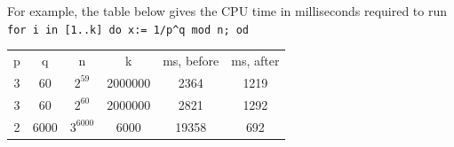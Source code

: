 \documentclass{deliverablereport}
\begin{document}

For example, the table below gives the CPU time in milliseconds required
to run \verb|for i in [1..k] do x:= 1/p^q mod n; od|

\begin{center}
\begin{tabular}{| c | c | c | c | c | c |} 
\hline
p & q    & n          & k        & ms, before & ms, after \\
3 & 60   & $2^{59}$   & 2000000  & 2364       & 1219 \\
3 & 60   & $2^{60}$   & 2000000  & 2821       & 1292 \\
2 & 6000 & $3^{6000}$ & 6000     & 19358      & 692  \\
\hline
\end{tabular}
\end{center}

%
%

%
%

%
%
%
\end{document}
